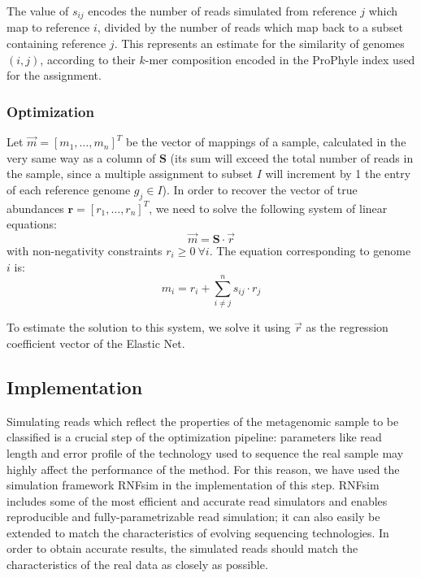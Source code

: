 The value of $s_{ij}$ encodes the number of reads simulated from reference $j$ which map to reference $i$, divided by the number of reads which map back to a subset containing reference $j$. This represents an estimate for the similarity of genomes $(i,j)$, according to their $k$-mer composition encoded in the ProPhyle index used for the assignment.

\subsubsection{Optimization}
Let $\vec{m} = [m_1, \dots, m_n]^T$ be the vector of mappings of a sample, calculated in the very same way as a column of $\boldsymbol{S}$ (its sum will exceed the total number of reads in the sample, since a multiple assignment to subset $I$ will increment by 1 the entry of each reference genome $g_j \in I$). In order to recover the vector of true abundances $\mathbf{r} = [r_1, \dots, r_n]^T$, we need to solve the following system of linear equations:
\begin{equation*}
  \vec{m} = \boldsymbol{S} \cdot \vec{r}
\end{equation*}
with non-negativity constraints $r_i \geq 0~\forall i$. The equation corresponding to genome $i$ is:
\begin{equation*}
  m_i = r_i + \sum_{i \neq j}^n s_{ij} \cdot r_j
\end{equation*}

To estimate the solution to this system, we solve it using $\vec{r}$ as the regression coefficient vector of the Elastic Net.

\subsection{Implementation}

Simulating reads which reflect the properties of the metagenomic sample to be classified is a crucial step of the optimization pipeline: parameters like read length and error profile of the technology used to sequence the real sample may highly affect the performance of the method. For this reason, we have used the simulation framework RNFsim \cite{brinda_rnf_2016} in the implementation of this step. RNFsim includes some of the most efficient and accurate read simulators and enables reproducible and fully-parametrizable read simulation; it can also easily be extended to match the characteristics of evolving sequencing technologies. In order to obtain accurate results, the simulated reads should match the characteristics of the real data as closely as possible.

